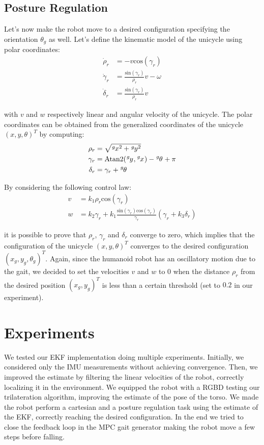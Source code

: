 \documentclass[a4paper]{article}
\begin{document}
\subsection{Posture Regulation}
\label{subsec:posture_regulation}
Let's now make the robot move to a desired configuration specifying the
orientation $\theta_g$ as well.
Let's define the kinematic model of the unicycle using
polar coordinates:
\begin{align}
    \dot{\rho}_r &= -v \text{cos}(\gamma_r) \\
    \dot{\gamma}_r &= \frac{\text{sin}(\gamma_r)}{\rho_r}v - \omega \\
    \dot{\delta}_r &= \frac{\text{sin}(\gamma_r)}{\rho_r}v
\end{align}

\noindent with $v$ and $w$ respectively linear and angular velocity of the
unicycle. The polar coordinates can be obtained from the generalized
coordinates of the unicycle $(x, y, \theta)^T$ by computing:
\begin{align}
    \rho_r &= \sqrt{\tensor[^g]{x}{^2} + \tensor[^g]{y}{^2}} \\
    \gamma_r &= \text{Atan2}(\tensor[^g]{y}{}, \tensor[^g]{x}{}) - \tensor[^g]{\theta}{} + \pi \\
    \delta_r &= \gamma_r + \tensor[^g]{\theta}{}
\end{align}

By considering the following control law:
\begin{align}
    \label{eq:posture-regulation-control-law-v}
    v &= k_1 \rho_r \text{cos}(\gamma_r) \\
    \label{eq:posture-regulation-control-law-w}
    w &= k_2 \gamma_r + k_1 \frac{\text{sin}(\gamma_r) \text{cos}(\gamma_r)}{\gamma_r}(\gamma_r + k_3 \delta_r)
\end{align}

\noindent it is possible to prove\cite{Siciliano:2008:RMP:1524151}
that $\rho_r$, $\gamma_r$ and $\delta_r$ converge to zero, which implies that
the configuration of the unicycle $(x, y, \theta)^T$ converges to the desired
configuration $(x_g, y_g, \theta_g)^T$.
Again, since the humanoid robot has an oscillatory motion due to the
gait, we decided to set the velocities $v$ and $w$ to $0$ when the distance $\rho_r$
from the desired position $(x_g, y_g)^T$ is less than a certain threshold (set
to $0.2$ in our experiment).

\section{Experiments}
We tested our EKF implementation doing multiple experiments. Initially, we
considered only the IMU measurements without achieving convergence. Then,
we improved the estimate by filtering the linear velocities of the robot,
correctly localizing it in the environment.
We equipped the robot with a RGBD testing our trilateration algorithm,
improving the estimate of the pose of the torso. We made the robot perform
a cartesian and a posture regulation task using the estimate of the EKF,
correctly reaching the desired configuration.
In the end we tried to close the feedback loop in the MPC gait generator
making the robot move a few steps before falling.
\end{document}
